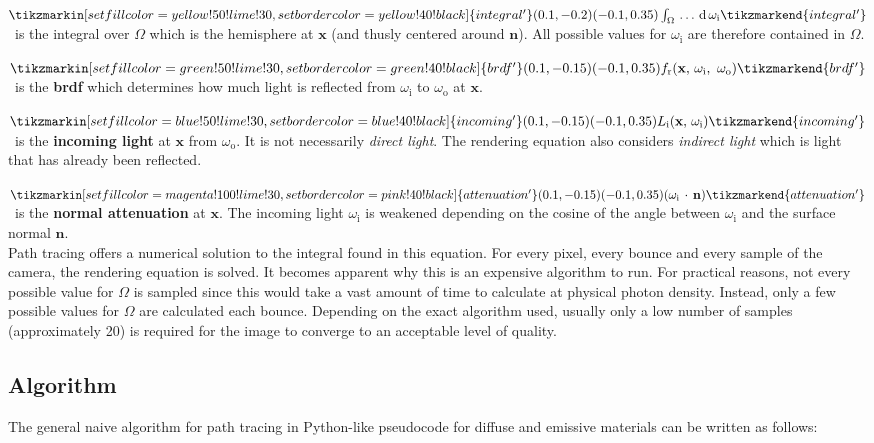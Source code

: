 \documentclass[
  twoside,
  11pt, a4paper,
  footinclude=true,
  headinclude=true,
  cleardoublepage=empty
]{scrreprt}
\begin{document}
\noindent
\(
        \tikzmarkin[set fill color=yellow!50!lime!30,set border color=yellow!40!black]{integral'}(0.1,-0.2)(-0.1,0.35)
        \int_\Omega \, \ldots \, \operatorname d \omega_{\text{i}}
        \tikzmarkend{integral'}
\)\, is the integral over \(\Omega\) which is the hemisphere at \(\mathbf x\) (and thusly
centered around \(\mathbf n\)). All possible values for \(\omega_{\text{i}}\) are therefore
contained in \(\Omega\).

\noindent
\(
        \tikzmarkin[set fill color=green!50!lime!30,set border color=green!40!black]{brdf'}(0.1,-0.15)(-0.1,0.35)
            f_{\text{r}}(\mathbf x,\, \omega_{\text{i}},\ \omega_{\text{o}})
        \tikzmarkend{brdf'}
\)\, is the \textbf{\ac{brdf}} which determines how much light is reflected from
\(\omega_{\text{i}}\) to \(\omega_{\text{o}}\) at \(\mathbf x\).

\noindent
\(
        \tikzmarkin[set fill color=blue!50!lime!30,set border color=blue!40!black]{incoming'}(0.1,-0.15)(-0.1,0.35)
            L_{\text{i}}(\mathbf x,\, \omega_{\text{i}})
        \tikzmarkend{incoming'}
\)\, is the \textbf{incoming light} at \(\mathbf x\) from \(\omega_{\text{o}}\). It is not necessarily
\emph{direct light}. The rendering equation also considers \emph{indirect light} which is light that has already
been reflected.

\noindent
\(
        \tikzmarkin[set fill color=magenta!100!lime!30,set border color=pink!40!black]{attenuation'}(0.1,-0.15)(-0.1,0.35)
            (\omega_{\text{i}}\,\cdot\,\mathbf n)
        \tikzmarkend{attenuation'}
\)\, is the \textbf{normal attenuation} at \(\mathbf x\). The incoming light \(\omega_{\text{i}}\) is
weakened depending on the cosine of the angle between \(\omega_{\text{i}}\) and the surface normal
\(\mathbf n\).
\\

Path tracing offers a numerical solution to the integral found in this equation. For every pixel,
every bounce and every sample of the camera, the rendering equation is solved. It becomes apparent
why this is an expensive algorithm to run. For practical reasons, not every possible value for
\(\Omega\) is sampled since this would take a vast amount of time to calculate at physical photon
density. Instead, only a few possible values for \(\Omega\) are calculated each bounce. Depending
on the exact algorithm used, usually only a low number of samples (approximately 20) is required for the
image to converge to an acceptable level of quality.

\subsection{Algorithm}
\label{algorithm}
The general naive algorithm for path tracing in Python-like pseudocode for diffuse and
emissive materials can be written as follows:
\end{document}
